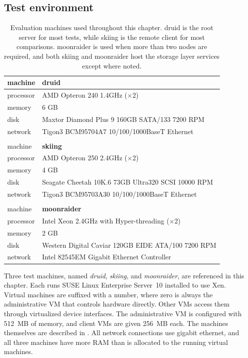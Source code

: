 \subsection{Test environment}

\begin{table}[t]
\begin{center}
\begin{tabular}{l|l}
machine      & \textbf{druid} \\ \hline
processor    & AMD Opteron 240 1.4GHz ($\times$2) \\
memory       & 6 GB \\
disk         & Maxtor Diamond Plus 9 160GB SATA/133 7200 RPM \\
network      & Tigon3 BCM95704A7 10/100/1000BaseT Ethernet \\
& \\
machine      & \textbf{skiing} \\ \hline
processor    & AMD Opteron 250 2.4GHz ($\times$2) \\
memory       & 4 GB \\
disk         & Seagate Cheetah 10K.6 73GB Ultra320 SCSI 10000 RPM \\
network      & Tigon3 BCM95703A30 10/100/1000BaseT Ethernet \\
& \\
machine      & \textbf{moonraider} \\ \hline
processor    & Intel Xeon 2.4GHz with Hyper-threading ($\times$2) \\
memory       & 2 GB \\
disk         & Western Digital Caviar 120GB EIDE ATA/100 7200 RPM \\
network      & Intel 82545EM Gigabit Ethernet Controller
\end{tabular}
\end{center}
\caption[Machines used in the evaluation]{Evaluation machines used throughout this chapter. druid is the root server for most tests, while skiing is the remote client for most comparisons. moonraider is used when more than two nodes are required, and both skiing and moonraider host the storage layer services except where noted.}
\label{tab:hardware}
\end{table}

Three test machines, named \emph{druid}, \emph{skiing}, and \emph{moonraider}, are referenced in this chapter. Each runs SUSE Linux Enterprise Server~10 installed to use Xen. Virtual machines are suffixed with a number, where zero is always the administrative VM that controls hardware directly. Other VMs access them through virtualized device interfaces. The administrative VM is configured with 512~MB of memory, and client VMs are given 256~MB each. The machines themselves are described in . All network connections use gigabit ethernet, and all three machines have more RAM than is allocated to the running virtual machines.

